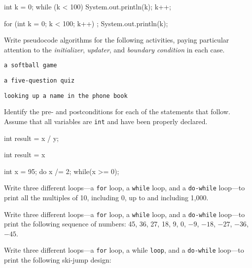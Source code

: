 \begin{EXRtwo}
\begin{EXRtwoLL}
\item

int k = 0;
while (k < 100)
    System.out.println(k);
    k++;


\item

for (int k = 0; k < 100; k++) ;
    System.out.println(k);

\end{EXRtwoLL}

\item  Write pseudocode algorithms for the following activities,
paying particular attention to the {\it initializer},
{\it updater}, and {\it boundary condition} in each case.
\begin{EXRtwoLL}
\item  {\tt a softball game}
\item  {\tt a five-question quiz}
\item  {\tt looking up a name in the phone book}
\end{EXRtwoLL}

\item  Identify the pre- and postconditions for each of the
 statements that follow. Assume that all variables are {\tt int}
and have been properly declared.
\begin{EXRtwoLL}
\item

 int result = x / y;


\item

 int result = x %


\item

 int x = 95;
do
    x /= 2;
while(x >= 0);

\end{EXRtwoLL}


\item  Write three different loops---a {\tt for} loop, a {\tt while} loop, and a {\tt do-while}
loop---to print all the multiples of 10, including 0, up to and
including 1,000.

\item  Write three different loops---a {\tt for} loop, a {\tt while} loop, and a {\tt do-while}
loop---to print the following sequence of numbers: 45, 36, 27, 18, 9, 0,
$-9$, $-18$, $-27$, $-36$, $-45$.


\item  Write three different loops---a {\tt for} loop, a while {\tt loop}, and a {\tt do-while}
loop---to print the following ski-jump design:


\end{EXRtwo}
